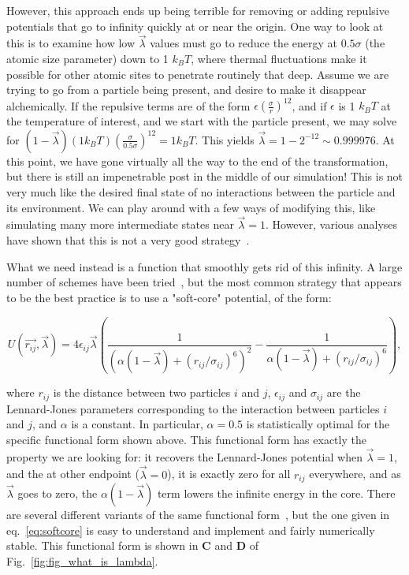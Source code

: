 \documentclass[9pt,bestpractices]{livecoms}
\begin{document}
However, this approach ends up being terrible for removing or adding repulsive potentials that go to infinity quickly at or near the origin. One way to look at this is to examine how low $\vec{\lambda}$ values must go to reduce the energy at $0.5\sigma$ (the atomic size parameter) down to 1 $k_BT$, where thermal fluctuations make it possible for other atomic sites to penetrate routinely that deep. Assume we are trying to go from a particle being present, and desire to make it disappear alchemically. If the repulsive terms are of the form $\epsilon(\frac{\sigma}{r})^{12}$, and if $\epsilon$ is 1 $k_BT$ at the temperature of interest, and we start with the particle present, we may solve for $(1-\vec{\lambda})(1 k_B T)\left(\frac{\sigma}{0.5\sigma}\right)^{12} = 1 k_B T$. This yields $\vec{\lambda} = 1-2^{-12} \sim 0.999976$. At this point,  we have gone virtually all the way to the end of the transformation, but there is still an impenetrable post in the middle of our simulation! This is not very much like the desired final state of no interactions between the particle and its environment. We can play around with a few ways of modifying this, like simulating many more intermediate states near $\vec{\lambda}=1$. However, various analyses have shown that this is not a very good strategy~\cite{pham2011identifying, beutler1994avoiding, zacharias1994separationshifted, blondel2004ensemble, gapsys2012new}.

What we need instead is a function that smoothly gets rid of this infinity. A large number of schemes have been tried~\cite{beutler1994avoiding, zacharias1994separationshifted, blondel2004ensemble, pham2011identifying, pham2012optimal, naden2014linear, donnini2005incorporating}, but the most common strategy that appears to be the best practice is to use a "soft-core" potential, of the form:

\begin{equation}
    U(\vec{r_{ij}},\vec{\lambda}) = 4\epsilon_{ij} \vec{\lambda} \left(\frac{1}{(\alpha(1-\vec{\lambda}) + (r_{ij}/\sigma_{ij})^6)^2} -  \frac{1}{\alpha(1-\vec{\lambda}) + (r_{ij}/\sigma_{ij})^6}\right)
    \label{eq:softcore},
\end{equation}

where $r_{ij}$ is the distance between two particles $i$ and $j$, $\epsilon_{ij}$ and $\sigma_{ij}$ are the Lennard-Jones parameters corresponding to the interaction between particles $i$ and $j$, and $\alpha$ is a constant. In particular, $\alpha=0.5$ is statistically optimal for the specific functional form shown above. This functional form has exactly the property we are looking for: it recovers the Lennard-Jones potential when $\vec{\lambda}=1$, and the at other endpoint ($\vec{\lambda}=0$), it is exactly zero for all $r_{ij}$ everywhere, and as $\vec{\lambda}$ goes to zero, the $\alpha(1-\vec{\lambda})$ term lowers the infinite energy in the core. There are several different variants of the same functional form~\cite{zacharias1994separationshifted, beutler1994avoiding,pham2011identifying}, but the one given in eq.~\ref{eq:softcore} is easy to understand and implement and fairly numerically stable. This functional form is shown in \textbf{C} and \textbf{D} of Fig.~\ref{fig:fig_what_is_lambda}.
\end{document}
